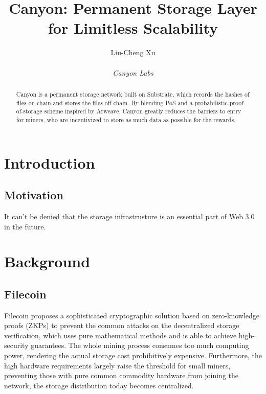 \documentclass[]{article}
\title{Canyon: Permanent Storage Layer for Limitless Scalability}
\author{
    Liu-Cheng Xu\\
    \\
    \textit{Canyon Labs}
}
\date{}
\begin{document}
\maketitle

\begin{abstract}

Canyon is a permanent storage network built on Substrate, which records the hashes of files on-chain and stores the files off-chain. By blending PoS and a probabilistic proof-of-storage scheme inspired by Arweave, Canyon greatly reduces the barriers to entry for miners, who are incentivized to store as much data as possible for the rewards.

\end{abstract}

\tableofcontents

\newpage

\section{Introduction}

\subsection{Motivation}

It can't be denied that the storage infrastrusture is an essential part of Web 3.0 in the future.



\section{Background}

\subsection{Filecoin}

Filecoin\cite{ref1} proposes a sophisticated cryptographic solution based on zero-knowledge proofs (ZKPs) to prevent the common attacks on the decentralized storage verification, which uses pure mathematical methods and is able to achieve high-security guarantees. The whole mining process consumes too much computing power, rendering the actual storage cost prohibitively expensive. Furthermore, the high hardware requirements largely raise the threshold for small miners, preventing those with pure common commodity hardware from joining the network, the storage distribution today becomes centralized.
\end{document}
